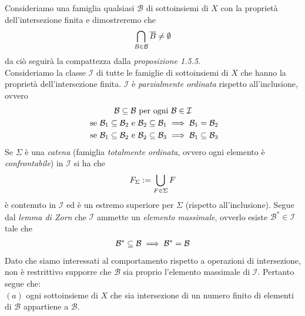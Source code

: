 \documentclass{article}
\begin{document}
Consideriamo una famiglia qualsiasi $\mathcal{B}$ di sottoinsiemi di $X$ con la proprietà dell'intersezione finita e dimostreremo che
\begin{gather}
    \bigcap_{B \in \mathcal{B}} \overline{B} \neq \emptyset \notag
\end{gather}
da ciò seguirà la compattezza dalla \textit{proposizione 1.5.5}. \\
Consideriamo la classe $\mathcal{I}$ di tutte le famiglie di sottoinsiemi di $X$ che hanno la proprietà dell'intersezione finita. $\mathcal{I}$ è \textit{parzialmente ordinata} rispetto all'inclusione, ovvero
\begin{gather}
    \mathcal{B} \subseteq \mathcal{B} \text{ per ogni } \mathcal{B} \in \mathcal{I} \notag \\
    \text{ se } \mathcal{B}_1 \subseteq \mathcal{B}_2 \text{ e } \mathcal{B}_2 \subseteq \mathcal{B}_1 \implies \mathcal{B}_1 = \mathcal{B}_2 \notag \\
    \text{ se } \mathcal{B}_1 \subseteq \mathcal{B}_2 \text{ e } \mathcal{B}_2 \subseteq \mathcal{B}_3 \implies \mathcal{B}_1 \subseteq \mathcal{B}_3 \notag
\end{gather}
Se $\Sigma$ è una \textit{catena} (famiglia \textit{totalmente ordinata}, ovvero ogni elemento è \textit{confrontabile}) in $\mathcal{I}$ si ha che
\begin{gather}
    F_\Sigma := \bigcup_{F \in \Sigma} F \notag
\end{gather}
è contenuto in $\mathcal{I}$ ed è un estremo superiore per $\Sigma$ (rispetto all'inclusione). Segue dal \textit{lemma di Zorn} che $\mathcal{I}$ ammette un \textit{elemento massimale}, ovverlo esiste $\mathcal{B}^* \in \mathcal{I}$ tale che
\begin{gather}
    \mathcal{B}^* \subseteq \mathcal{B} \implies \mathcal{B}^* = \mathcal{B} \notag
\end{gather}
Dato che siamo interessati al comportamento rispetto a operazioni di intersezione, non è restrittivo supporre che $\mathcal{B}$ sia proprio l'elemento massimale di $\mathcal{I}$. Pertanto segue che: \\

$(a)$ ogni sottoinsieme di $X$ che sia intersezione di un numero finito di elementi di $\mathcal{B}$ appartiene a $\mathcal{B}$.
\end{document}
